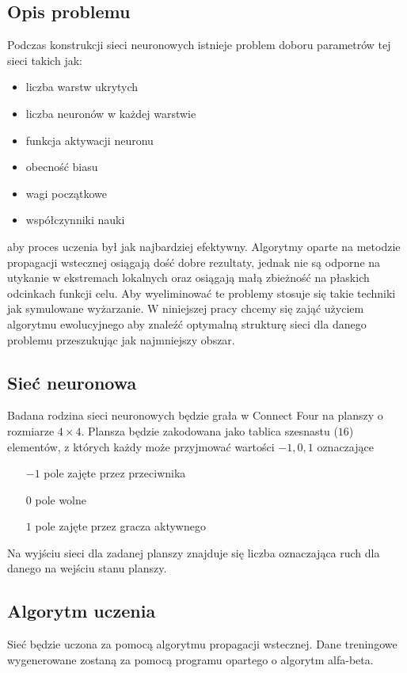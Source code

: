 \documentclass{llncs}
\begin{document}
\subsection{Opis problemu}
Podczas konstrukcji sieci neuronowych istnieje problem doboru parametrów tej sieci takich jak:
\begin{itemize}
	\item liczba warstw ukrytych
	\item liczba neuronów w każdej warstwie
	\item funkcja aktywacji neuronu
	\item obecność biasu
	\item wagi początkowe
	\item współczynniki nauki
\end{itemize}
aby proces uczenia był jak najbardziej efektywny. Algorytmy oparte na metodzie propagacji wstecznej osiągają
dość dobre rezultaty, jednak nie są odporne na utykanie w ekstremach lokalnych oraz osiągają małą zbieżność
na płaskich odcinkach funkcji celu. Aby wyeliminować te problemy stosuje się takie techniki jak symulowane wyżarzanie.
W niniejszej pracy chcemy się zająć użyciem algorytmu ewolucyjnego aby znaleźć optymalną strukturę sieci
dla danego problemu przeszukując jak najmniejszy obszar.

\subsection{Sieć neuronowa}
Badana rodzina sieci neuronowych będzie grała w Connect Four na planszy o rozmiarze $4 \times 4$. Plansza będzie zakodowana
jako tablica szesnastu ($16$) elementów, z których każdy może przyjmować wartości $-1,0,1$ oznaczające
\begin{itemize}
	\item[$-1$] pole zajęte przez przeciwnika
	\item[$0$] pole wolne
	\item[$1$] pole zajęte przez gracza aktywnego
\end{itemize}
Na wyjściu sieci dla zadanej planszy znajduje się liczba oznaczająca ruch dla danego na wejściu stanu planszy.

\subsection{Algorytm uczenia}
Sieć będzie uczona za pomocą algorytmu propagacji wstecznej. Dane treningowe wygenerowane zostaną za pomocą programu
opartego o algorytm alfa-beta.
\end{document}
